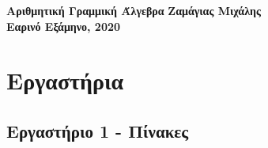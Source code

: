\documentclass[a4paper,12pt]{article}
\begin{document}
\begin{titlepage}
    \begin{center}
        \vspace*{\fill}
        \huge{\textbf{Αριθμητική Γραμμική Άλγεβρα}}
        \vspace*{\fill}
        \vfill
        \normalsize\textbf{Ζαμάγιας Μιχάλης\\}
        \small\textbf{Εαρινό Εξάμηνο, 2020\\}
        \vfill
    \end{center}
\end{titlepage}

\tableofcontents

\newpage\section{Εργαστήρια}

\newpage\subsection{Εργαστήριο 1 - Πίνακες}
\end{document}
